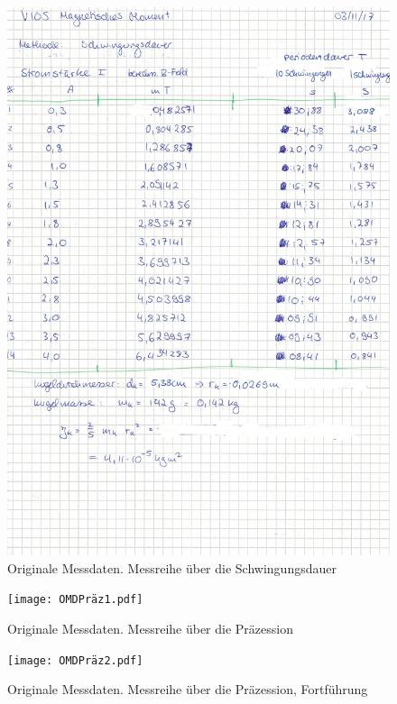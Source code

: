 \begin{figure}
  \centering
  \includegraphics[width=\textwidth]{OMDSchwing.pdf}
  \caption{Originale Messdaten. Messreihe über die Schwingungsdauer}
  \label{OMDSchwing}
\end{figure}

\begin{figure}
  \centering
  \texttt{[image: OMDPräz1.pdf]}
  \caption{Originale Messdaten. Messreihe über die Präzession}
  \label{OMDPräz1}
\end{figure}

\begin{figure}
  \centering
  \texttt{[image: OMDPräz2.pdf]}
  \caption{Originale Messdaten. Messreihe über die Präzession, Fortführung}
  \label{OMDPräz2}
\end{figure}

\nocite{*}
\printbibliography



